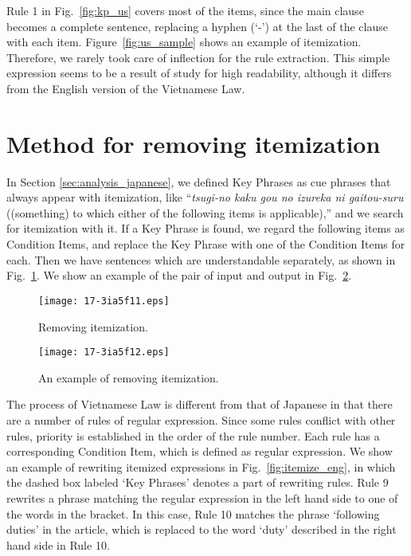 \documentclass[english]{jnlp_1.4}
\begin{document}
Rule 1 in Fig.~\ref{fig:kp_us} covers most of the items, since the main
clause becomes a complete sentence, replacing a hyphen (`-') at the
last of the clause with each item.
Figure~\ref{fig:us_sample} shows an example of itemization.
Therefore, we rarely took care of inflection for the rule extraction.
This simple expression seems to be a result of study for high
readability, although it differs from the English version of the Vietnamese Law.


\section{Method for removing itemization}

In Section \ref{sec:analysis_japanese}, we defined Key Phrases as cue phrases that always appear
with itemization, like ``{\it tsugi-no kaku gou no izureka ni
gaitou-suru} ((something) to which either of the following items is
applicable),'' and we search for itemization with it.
If a Key Phrase is found, we regard the following items as Condition
Items, and replace the Key Phrase with one of the Condition Items for
each. Then we have sentences which are understandable
separately, as shown in Fig.~\ref{fig:itemize1}.
We show an example of the pair of input and output in
Fig.~\ref{fig:itemize2}.


\begin{figure}[b]
\begin{center}
\texttt{[image: 17-3ia5f11.eps]}
\end{center}
 \caption{Removing itemization.}
 \label{fig:itemize1}
\end{figure}
\begin{figure}[b]
\begin{center}
\texttt{[image: 17-3ia5f12.eps]}
\end{center}
 \caption{An example of removing itemization.}
 \label{fig:itemize2}
\end{figure}


The process of Vietnamese Law is different from that of Japanese in that 
there are a number of rules of regular expression.
Since some rules conflict with other rules, priority is established
in the order of the rule number.
Each rule has a corresponding Condition Item, which is defined as
regular expression.
We show an example of rewriting itemized expressions in
Fig.~\ref{fig:itemize_eng}, in which the dashed box labeled `Key
Phrases' denotes a part of rewriting rules.
Rule 9 rewrites a phrase matching the regular expression in the left
hand side to one of the words in the bracket.
In this case, Rule 10 matches the phrase `following duties' in the
article, which is replaced to the word `duty' described in the right
hand side in Rule 10.
\end{document}
